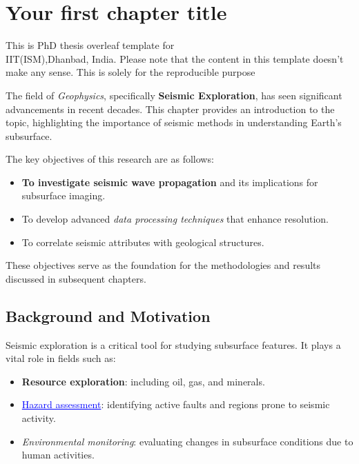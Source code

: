 \chapter{Your first chapter title} \label{Chapter: 1}

\newpage

\justifying
{\huge This is PhD thesis overleaf template for \\ IIT(ISM),Dhanbad, India. Please note that the content in this template doesn't make any sense. This is solely for the reproducible purpose}

The field of \textit{Geophysics}, specifically \textbf{Seismic Exploration}, has seen significant advancements in recent decades. This chapter provides an introduction to the topic, highlighting the importance of seismic methods in understanding Earth's subsurface. 

The key objectives of this research are as follows:
\begin{itemize}
    \item \textbf{To investigate seismic wave propagation} and its implications for subsurface imaging.
    \item To develop advanced \textit{data processing techniques} that enhance resolution.
    \item To correlate seismic attributes with geological structures.
\end{itemize}

\noindent These objectives serve as the foundation for the methodologies and results discussed in subsequent chapters.

\section{Background and Motivation}
Seismic exploration is a critical tool for studying subsurface features. It plays a vital role in fields such as:
\begin{itemize}
    \item \textbf{Resource exploration}: including oil, gas, and minerals.
    \item \textcolor{blue}{\underline{Hazard assessment}}: identifying active faults and regions prone to seismic activity.
    \item \textit{Environmental monitoring}: evaluating changes in subsurface conditions due to human activities.
\end{itemize}

